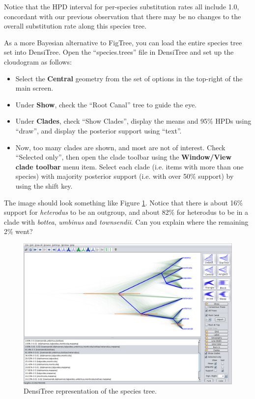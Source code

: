 \documentclass{article}
\begin{document}
Notice that the HPD interval for per-species substitution rates all include
1.0, concordant with our previous observation that there may be no changes
to the overall substitution rate along this species tree.

As a more Bayesian alternative to FigTree, you can load the entire species tree
set into DensiTree. Open the ``species.trees'' file in DensiTree and set up the
cloudogram as follows:

\begin{itemize}
\item Select the \textbf{Central} geometry from the set of options in the top-right of the main screen.
\item Under \textbf{Show}, check the ``Root Canal'' tree to guide the eye.
\item Under \textbf{Clades}, check ``Show Clades'', display the means and 95\% HPDs using ``draw'', and display the posterior support
using ``text''.
\item Now, too many clades are shown, and most are not of interest. Check
``Selected only'', then open the clade toolbar using the \textbf{Window/View
clade toolbar} menu item. Select each clade (i.e.
items with more than one species) with majority posterior support (i.e.
with over 50\% support) by using the
shift key.
\end{itemize}

The image should look something like Figure \ref{fig:densitree}. Notice that
there is about 16\% support for \textit{heterodus} to be an outgroup, and about
82\% for heterodus to be in a clade with \textit{bottea}, \textit{umbinus} and
\textit{townsendii}. Can you explain where the remaining 2\% went?

\begin{figure}
\centering
\includegraphics[width=\textwidth]{figures/densitree.png}
\caption{DensiTree representation of the species tree.}
\label{fig:densitree}
\end{figure}

\clearpage



\end{document}
